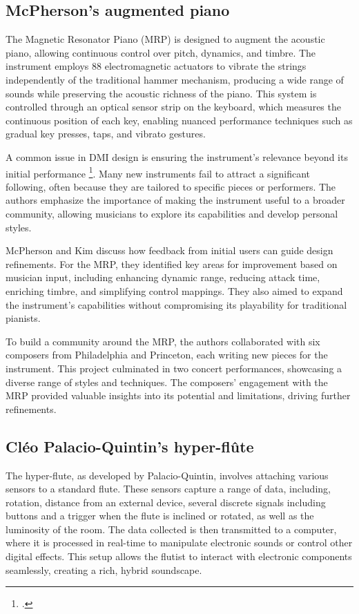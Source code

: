 \documentclass[12pt,twoside,maitrise]{dms_ks}
\theoremstyle{definition}
\begin{document}
{{\subsection{McPherson's augmented piano}

The Magnetic Resonator Piano (MRP) is designed to augment the acoustic piano, allowing continuous control over pitch, dynamics, and timbre. 
The instrument employs 88 electromagnetic actuators to vibrate the strings independently of the traditional hammer mechanism, producing a wide range of sounds while preserving the acoustic richness of the piano. 
This system is controlled through an optical sensor strip on the keyboard, which measures the continuous position of each key, enabling nuanced performance techniques such as gradual key presses, taps, and vibrato gestures.

A common issue in DMI design is ensuring the instrument's relevance beyond its initial performance \footcite{mcpherson_problem_2012}. 
Many new instruments fail to attract a significant following, often because they are tailored to specific pieces or performers. 
The authors emphasize the importance of making the instrument useful to a broader community, allowing musicians to explore its capabilities and develop personal styles.

McPherson and Kim discuss how feedback from initial users can guide design refinements. 
For the MRP, they identified key areas for improvement based on musician input, including enhancing dynamic range, reducing attack time, enriching timbre, and simplifying control mappings. 
They also aimed to expand the instrument's capabilities without compromising its playability for traditional pianists.

To build a community around the MRP, the authors collaborated with six composers from Philadelphia and Princeton, each writing new pieces for the instrument. 
This project culminated in two concert performances, showcasing a diverse range of styles and techniques. 
The composers' engagement with the MRP provided valuable insights into its potential and limitations, driving further refinements.

\subsection{Cléo Palacio-Quintin's hyper-flûte}

The hyper-flute, as developed by Palacio-Quintin, involves attaching various sensors to a standard flute. 
These sensors capture a range of data, including, rotation, distance from an external device, several discrete signals including buttons and a trigger when the flute is inclined or rotated, as well as the luminosity of the room. 
The data collected is then transmitted to a computer, where it is processed in real-time to manipulate electronic sounds or control other digital effects. 
This setup allows the flutist to interact with electronic components seamlessly, creating a rich, hybrid soundscape.

}}
\end{document}
